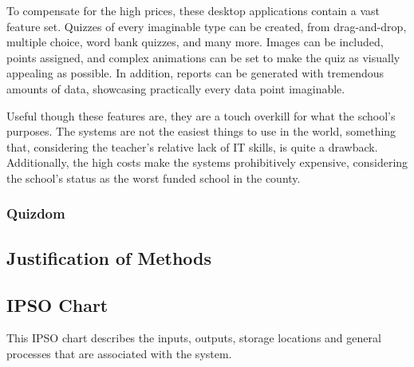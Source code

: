 To compensate for the high prices, these desktop applications contain a vast feature set. Quizzes of every imaginable type can be created, from drag-and-drop, multiple choice, word bank quizzes, and many more. Images can be included, points assigned, and complex animations can be set to make the quiz as visually appealing as possible. In addition, reports can be generated with tremendous amounts of data, showcasing practically every data point imaginable.

Useful though these features are, they are a touch overkill for what the school's purposes. The systems are not the easiest things to use in the world, something that, considering the teacher's relative lack of IT skills, is quite a drawback. Additionally, the high costs make the systems prohibitively expensive, considering the school's status as the worst funded school in the county.

\subsubsection{Quizdom}


\subsection{Justification of Methods}

\subsection{IPSO Chart}
This IPSO chart describes the inputs, outputs, storage locations and general processes that are associated with the system.


